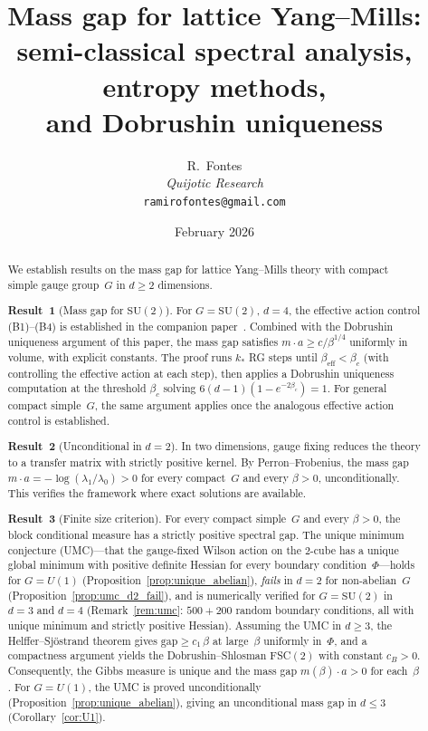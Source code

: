 \documentclass[11pt,a4paper]{article}
\title{Mass gap for lattice Yang--Mills:\\
  semi-classical spectral analysis, entropy methods,\\
  and Dobrushin uniqueness}
\author{R.\ Fontes\\ \textit{Quijotic Research}\\
\texttt{ramirofontes@gmail.com}}
\date{February 2026}
\theoremstyle{plain}
\theoremstyle{definition}
\theoremstyle{remark}
\newcommand{\SU}{\mathrm{SU}}
\newcommand{\gap}{\mathrm{gap}}
\begin{document}
\maketitle

\begin{abstract}
We establish results on the mass gap for lattice
Yang--Mills theory with compact simple gauge group~$G$ in
$d \geq 2$ dimensions.

\textbf{Result~1} (Mass gap for $\SU(2)$).  For
$G = \SU(2)$, $d = 4$, the effective action control
(B1)--(B4) is established in the companion
paper~\cite{FontesSU2}.  Combined with the Dobrushin
uniqueness argument of this paper, the mass gap
satisfies $m \cdot a \geq c / \beta^{1/4}$ uniformly
in volume, with explicit constants.  The proof runs
$k_*$ RG steps until $\beta_{\mathrm{eff}} < \beta_c$
(with~\cite{FontesSU2} controlling the effective action
at each step), then applies a Dobrushin uniqueness
computation at the threshold
$\beta_c$ solving $6(d{-}1)(1 - e^{-2\beta_c}) = 1$.
For general compact simple~$G$, the same argument
applies once the analogous effective action control
is established.

\textbf{Result~2} (Unconditional in $d = 2$).  In two
dimensions, gauge fixing reduces the theory to a transfer
matrix with strictly positive kernel.  By Perron--Frobenius,
the mass gap $m \cdot a = -\log(\lambda_1/\lambda_0) > 0$
for every compact~$G$ and every $\beta > 0$, unconditionally.
This verifies the framework where exact solutions are
available.

\textbf{Result~3} (Finite size criterion).  For every compact
simple~$G$ and every $\beta > 0$, the block conditional
measure has a strictly positive spectral gap.
The unique minimum conjecture (UMC)---that the gauge-fixed
Wilson action on the $2$-cube has a unique global minimum
with positive definite Hessian for every boundary
condition~$\Phi$---holds for $G = U(1)$
(Proposition~\ref{prop:unique_abelian}),
\emph{fails} in $d = 2$ for non-abelian~$G$
(Proposition~\ref{prop:umc_d2_fail}),
and is numerically verified for $G = \SU(2)$ in
$d = 3$ and $d = 4$
(Remark~\ref{rem:umc}: $500 + 200$ random boundary
conditions, all with unique minimum and strictly
positive Hessian).
Assuming the UMC in $d \geq 3$, the
Helffer--Sj\"ostrand theorem gives
$\gap \geq c_1\,\beta$ at large~$\beta$ uniformly in~$\Phi$,
and a compactness argument yields the
Dobrushin--Shlosman FSC$(2)$ with constant $c_B > 0$.
Consequently, the Gibbs measure is unique and the mass gap
$m(\beta) \cdot a > 0$ for each~$\beta$.
For $G = U(1)$, the UMC is proved unconditionally
(Proposition~\ref{prop:unique_abelian}), giving
an unconditional mass gap in $d \leq 3$
(Corollary~\ref{cor:U1}).


\end{abstract}
\end{document}
